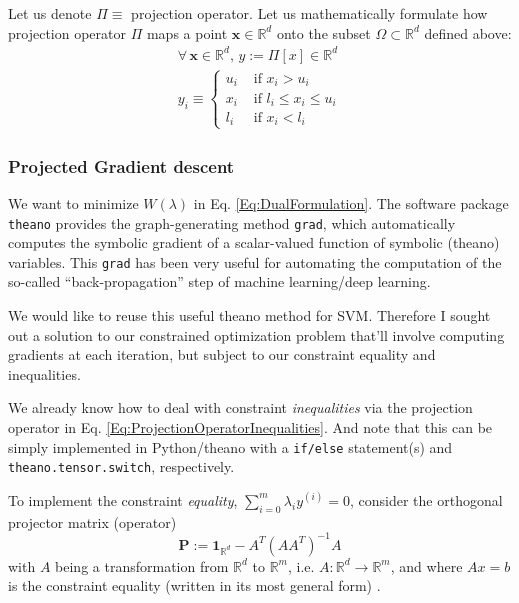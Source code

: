 \documentclass[10pt]{amsart}
\begin{document}
\begin{multicols*}{2}
Let us denote $\Pi \equiv $ projection operator.  Let us mathematically formulate how projection operator $\Pi$ maps a point $\mathbf{x} \in \mathbb{R}^d$ onto the subset $\Omega \subset \mathbb{R}^d$ defined above: 
\begin{equation}\label{Eq:ProjectionOperatorInequalities}
\begin{gathered}
  \forall \, \mathbf{x} \in \mathbb{R}^d, \, y := \Pi[x] \in \mathbb{R}^d \\ 
  y_i \equiv \begin{cases} u_i & \text{ if } x_i > u_i \\
    x_i & \text{ if } l_i \leq x_i \leq u_i \\
    l_i & \text{ if } x_i < l_i \end{cases}
  \end{gathered}
\end{equation}

\subsubsection{Projected Gradient descent}\label{SubSec:ProjectedGradDescent}

We want to minimize $W(\lambda)$ in Eq. \ref{Eq:DualFormulation}.  The software package \verb|theano| provides the graph-generating method \verb|grad|, which automatically computes the symbolic gradient of a scalar-valued function of symbolic (theano) variables.  This \verb|grad| has been very useful for automating the computation of the so-called ``back-propagation'' step of machine learning/deep learning.

We would like to reuse this useful theano method for SVM.  Therefore I sought out a solution to our constrained optimization problem that'll involve computing gradients at each iteration, but subject to our constraint equality and inequalities.

We already know how to deal with constraint \emph{inequalities} via the projection operator in Eq. \ref{Eq:ProjectionOperatorInequalities}.  And note that this can be simply implemented in Python/theano with a \verb|if/else| statement(s) and \verb|theano.tensor.switch|, respectively.  

To implement the constraint \emph{equality}, $\sum_{i=0}^m \lambda_i y^{(i)} = 0$, consider the orthogonal projector matrix (operator)
\begin{equation}
  \mathbf{P} := \mathbf{1}_{\mathbb{R}^d} - A^T(AA^T)^{-1}A 
  \end{equation}
with $A$ being a transformation from $\mathbb{R}^d$ to $\mathbb{R}^m$, i.e. $A: \mathbb{R}^d \to \mathbb{R}^m$, and where $Ax = b$ is the constraint equality (written in its most general form) \cite{ChZa2013}.  


\end{multicols*}
\end{document}

